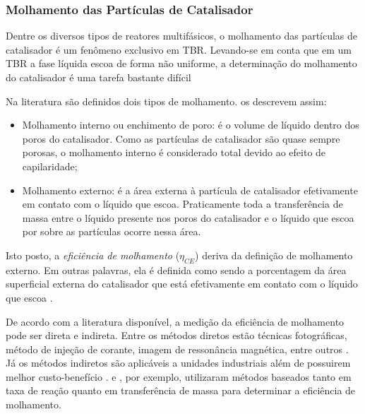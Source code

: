 
\subsubsection{Molhamento das Partículas de Catalisador}
\label{sec:molhamento}

Dentre os diversos tipos de reatores multifásicos, o molhamento das partículas
de catalisador é um fenômeno exclusivo em TBR. Levando-se em conta que em um
TBR a fase líquida escoa de forma não uniforme, a determinação do molhamento do
catalisador é uma tarefa bastante difícil \cite{Ranade2011}

Na literatura são definidos dois tipos de molhamento. 
os descrevem assim:

\begin{itemize}
	\item Molhamento interno ou enchimento de poro: é o volume de líquido dentro
	dos poros do catalisador. Como as partículas de catalisador são quase sempre
	porosas, o molhamento interno é considerado total devido ao efeito de
	capilaridade;
	\item Molhamento externo: é a área externa à partícula de catalisador
	efetivamente em contato com o líquido que escoa. Praticamente toda a
	transferência de massa entre o líquido presente nos poros do catalisador e o
	líquido que escoa por sobre as partículas ocorre nessa área.
\end{itemize}

Isto posto, a \emph{eficiência de molhamento} ($\eta_{CE}$) deriva da definição
de molhamento externo. Em outras palavras, ela é definida como sendo a
porcentagem da área superficial externa do catalisador que está efetivamente em
contato com o líquido que escoa \cite{Schwartz1976}.

De acordo com a literatura disponível, a medição da eficiência de molhamento
pode ser direta e indireta. Entre os métodos diretos estão técnicas
fotográficas, método de injeção de corante, imagem de ressonância magnética,
entre outros . Já os métodos indiretos são
aplicáveis a unidades industriais além de possuirem melhor custo-benefício
\cite{Ranade2011}.  e , por
exemplo, utilizaram métodos baseados tanto em taxa de reação quanto em
transferência de massa para determinar a eficiência de molhamento.

